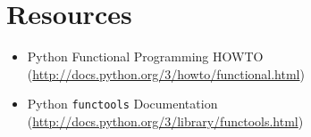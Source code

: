 \documentclass{article}\usepackage{beamerarticle}
\begin{document}
\section*{Resources}
\begin{frame}
\begin{itemize}
	\item Python Functional Programming HOWTO\\(\url{http://docs.python.org/3/howto/functional.html})
	\item Python {\tt functools} Documentation\\(\url{http://docs.python.org/3/library/functools.html})
\end{itemize}
\end{frame}
\end{document}
